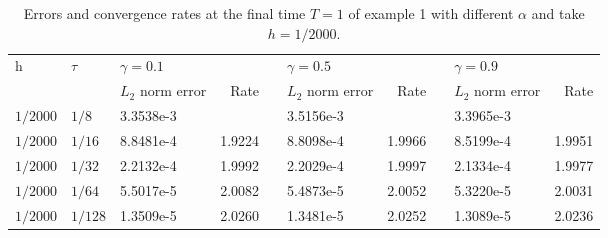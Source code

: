 \documentclass[3p,times]{elsarticle}
\begin{document}
\begin{table}[h!b!p!]
\small
\renewcommand{\arraystretch}{1.1}
\centering
\caption{\small Errors and convergence rates at the final time $T=1$ of example 1 with different $\alpha$ and take $h=1/2000$.}\label{tab1}
\begin{tabular}{p{0cm}p{0cm}p{1.4cm}p{1cm}p{0.5cm}p{1.4cm}p{1cm}p{0.5cm}p{1.4cm}p{1cm}}
\hline
\multicolumn{1}{l}{\multirow {2}{*}{h}}& \multicolumn{1}{l}{\multirow {2}{*}{$\tau$}}& \multicolumn{2}{l}{$\gamma=0.1$}&&\multicolumn{2}{l}{$\gamma=0.5$}&&\multicolumn{2}{l}{$\gamma=0.9$}\\
\cline{3-4}\cline{6-7} \cline{9-10}
&&\multicolumn{1}{l}{$L_2$ norm error} &\multicolumn{1}{r}{Rate} && \multicolumn{1}{l}{$L_2$ norm error} &\multicolumn{1}{r}{Rate} && \multicolumn{1}{l}{$L_2$ norm error} &\multicolumn{1}{r}{Rate} \\
\hline
\multicolumn{1}{l}{$1/2000$}&\multicolumn{1}{l}{$1/8$}&3.3538e-3&&&3.5156e-3&&&3.3965e-3\\
\multicolumn{1}{l}{$1/2000$}&\multicolumn{1}{l}{$1/16$}&8.8481e-4&\multicolumn{1}{r}{1.9224}&&8.8098e-4&\multicolumn{1}{r}{1.9966}&&8.5199e-4&\multicolumn{1}{r}{1.9951}\\
\multicolumn{1}{l}{$1/2000$}&\multicolumn{1}{l}{$1/32$}&2.2132e-4&\multicolumn{1}{r}{1.9992}&&2.2029e-4&\multicolumn{1}{r}{1.9997}&&2.1334e-4&\multicolumn{1}{r}{1.9977}\\
\multicolumn{1}{l}{$1/2000$}&\multicolumn{1}{l}{$1/64$}&5.5017e-5&\multicolumn{1}{r}{2.0082}&&5.4873e-5&\multicolumn{1}{r}{2.0052}&&5.3220e-5&\multicolumn{1}{r}{2.0031}\\
\multicolumn{1}{l}{$1/2000$}&\multicolumn{1}{l}{$1/128$}&1.3509e-5&\multicolumn{1}{r}{2.0260}&&1.3481e-5&\multicolumn{1}{r}{2.0252}&&1.3089e-5&\multicolumn{1}{r}{2.0236}\\
\hline
\end{tabular}
\end{table}
\end{document}
